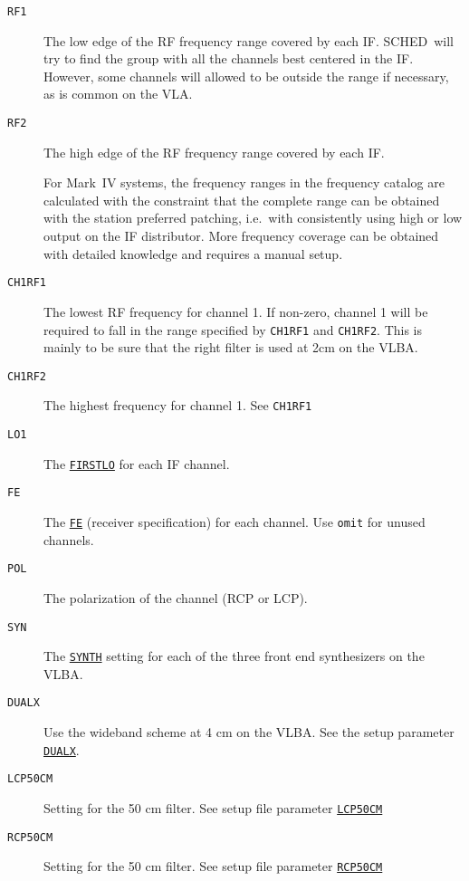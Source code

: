 \documentclass{report}
\newcommand{\schedb}{{\sc SCHED~}}
\begin{document}
\begin{description}
\item [{\tt RF1}] The low edge of the RF frequency range covered by
each IF.  \schedb will try to find the group with all the channels
best centered in the IF.  However, some channels will allowed to be
outside the range if necessary, as is common on the VLA.

\item [{\tt RF2}] The high edge of the RF frequency range covered by
each IF.

For Mark~IV systems, the frequency ranges in the frequency catalog
are calculated with the constraint that the complete range can be
obtained with the station preferred patching, i.e.\ with consistently
using high or low output on the IF distributor.  More frequency
coverage can be obtained with detailed knowledge and requires a manual
setup.

\item [{\tt CH1RF1}] The lowest RF frequency for channel 1.  If
non-zero, channel 1 will be required to fall in the range specified by
{\tt CH1RF1} and {\tt CH1RF2}.  This is mainly to be sure that the
right filter is used at 2cm on the VLBA.

\item [{\tt CH1RF2}] The highest frequency for channel 1.  See
{\tt CH1RF1}

\item [{\tt LO1}] The 
{\hyperref[SP:FIRSTLO]{{\tt FIRSTLO}}} for each IF
channel.

\item [{\tt FE}] The 
{\hyperref[SP:FE]{{\tt FE}}} (receiver
specification) for each channel.  Use {\tt omit} for unused channels.

\item [{\tt POL}] The polarization of the channel (RCP or LCP).

\item [{\tt SYN}] The 
{\hyperref[SP:SYNTH]{{\tt SYNTH}}} setting for each
of the three front end synthesizers on the VLBA.

\item [{\tt DUALX}] Use the wideband scheme at 4 cm on the VLBA.  See
the setup parameter 
{\hyperref[SP:DUALX]{{\tt DUALX}}}.

\item [{\tt LCP50CM}] Setting for the 50 cm filter.  See setup file
parameter 
{\hyperref[SP:LCP50CM]{{\tt LCP50CM}}}

\item [{\tt RCP50CM}] Setting for the 50 cm filter.  See setup file
parameter 
{\hyperref[SP:LCP50CM]{{\tt RCP50CM}}}


\end{description}
\end{document}

